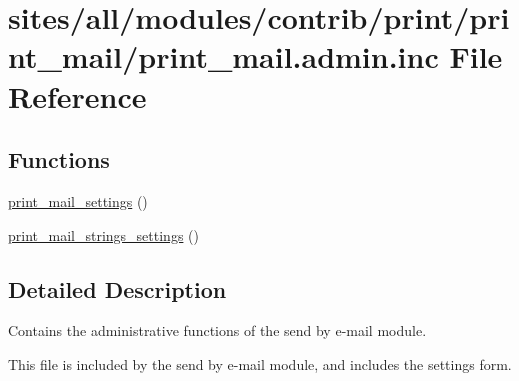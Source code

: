 \hypertarget{print__mail_8admin_8inc}{
\section{sites/all/modules/contrib/print/print\_\-mail/print\_\-mail.admin.inc File Reference}
\label{print__mail_8admin_8inc}
}
\subsection*{Functions}
\begin{CompactItemize}
\item 
\hyperlink{group__forms_gb3489dff3d2771599274bed287d0094e}{print\_\-mail\_\-settings} ()
\item 
\hyperlink{group__forms_gf73e954e3100496d07d88525e9349ca6}{print\_\-mail\_\-strings\_\-settings} ()
\end{CompactItemize}


\subsection{Detailed Description}
Contains the administrative functions of the send by e-mail module.

This file is included by the send by e-mail module, and includes the settings form. 